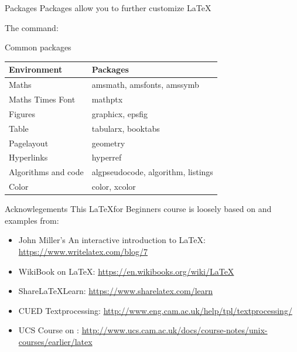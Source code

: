 \documentclass[10pt,times]{beamer}
\begin{document}
\begin{frame}{Packages}
Packages allow you to further customize \LaTeX
\begin{block}{The command:}
\end{block}

\begin{block}{Common packages}
\begin{tabularx}{0.95\textwidth}{lX}
\toprule
Environment & Packages \\ \midrule
Maths & amsmath, amsfonts, amssymb \\ 
Maths Times Font & {mathptx} \\
Figures & graphicx, epsfig \\
Table & tabularx, booktabs \\
Pagelayout & geometry \\
Hyperlinks & hyperref \\
Algorithms and code & algpseudocode, algorithm, listings \\
Color & color, xcolor \\
\bottomrule
\end{tabularx}
\end{block}
\end{frame}




\begin{frame}{Acknowlegements}
This \LaTeX for Beginners course is loosely based on and examples from:
\begin{itemize}
\item John Miller's An interactive introduction to \LaTeX: 
\href{https://www.writelatex.com/blog/7}{https://www.writelatex.com/blog/7}
\item WikiBook on \LaTeX: 
\href{https://en.wikibooks.org/wiki/LaTeX}{https://en.wikibooks.org/wiki/LaTeX}
\item Share\LaTeX Learn: 
\href{https://www.sharelatex.com/learn}{https://www.sharelatex.com/learn}
\item CUED Textprocessing: \href{http://www.eng.cam.ac.uk/help/tpl/textprocessing/}{http://www.eng.cam.ac.uk/help/tpl/textprocessing/}
\item UCS Course on \LaTeXe: \href{http://www.ucs.cam.ac.uk/docs/course-notes/unix-courses/earlier/latex}{http://www.ucs.cam.ac.uk/docs/course-notes/unix-courses/earlier/latex}
\end{itemize}
\end{frame}
\end{document}
